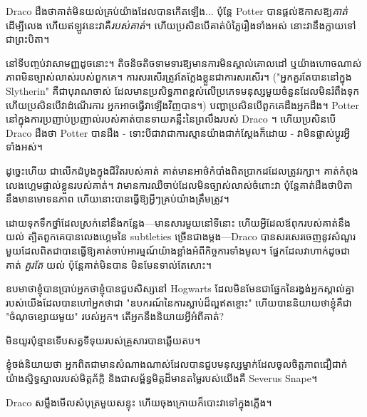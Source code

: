 Draco ដឹងថាគាត់មិនយល់គ្រប់យ៉ាងដែលបានកើតឡើង... ប៉ុន្តែ Potter បានផ្តល់ឱកាសឱ្យ\emph{គាត់} ដើម្បីលេង ហើយឥឡូវនេះវាគឺ\emph{របស់គាត់}។ ហើយ​ប្រសិន​បើ​គាត់​បំភ្លៃ​រឿង​ទាំង​អស់ នោះ​វា​នឹង​ក្លាយ​ទៅ​ជា​ព្រះបិតា។

នៅទីបញ្ចប់វាសាមញ្ញដូចនោះ។ តិចនិចតិចទាមទារឱ្យមានការមិនស្គាល់គោលដៅ ឬយ៉ាងហោចណាស់ភាពមិនច្បាស់លាស់របស់ពួកគេ។ ការ​សរសើរ​ត្រូវ​តែ​ក្លែង​ខ្លួន​ជា​ការ​សរសើរ។ ("អ្នកគួរតែបាននៅក្នុង Slytherin" គឺជាបុរាណចាស់ ដែលមានប្រសិទ្ធភាពខ្ពស់លើប្រភេទមនុស្សមួយចំនួនដែលមិនរំពឹងទុក ហើយប្រសិនបើវាដំណើរការ អ្នកអាចធ្វើវាឡើងវិញបាន។) បញ្ហាប្រសិនបើពួកគេដឹងអ្នកដឹង។ Potter នៅក្នុងការប្រញាប់ប្រញាល់របស់គាត់បានទាយគន្លឹះនៃព្រលឹងរបស់ Draco ។ ហើយប្រសិនបើ Draco ដឹងថា Potter បានដឹង - ទោះបីជាវាជាការស្មានយ៉ាងជាក់ស្តែងក៏ដោយ - វាមិនផ្លាស់ប្តូរអ្វីទាំងអស់។

ដូច្នេះហើយ ជាលើកដំបូងក្នុងជីវិតរបស់គាត់ គាត់មានអាថ៌កំបាំងពិតប្រាកដដែលត្រូវរក្សា។ គាត់កំពុងលេងហ្គេមផ្ទាល់ខ្លួនរបស់គាត់។ វាមានការឈឺចាប់ដែលមិនច្បាស់លាស់ចំពោះវា ប៉ុន្តែគាត់ដឹងថាបិតានឹងមានមោទនភាព ហើយនោះបានធ្វើឱ្យអ្វីៗគ្រប់យ៉ាងត្រឹមត្រូវ។

ដោយទុកទឹកថ្នាំដែលស្រក់នៅនឹងកន្លែង—មានសារមួយនៅទីនោះ ហើយអ្វីដែលឪពុករបស់គាត់នឹងយល់ ត្បិតពួកគេបានលេងហ្គេមនៃ subtleties ច្រើនជាងម្តង—Draco បានសរសេរចេញនូវសំណួរមួយដែលពិតជាបានធ្វើឱ្យគាត់ចាប់អារម្មណ៍យ៉ាងខ្លាំងអំពីកិច្ចការទាំងមូល។ ផ្នែកដែលវាហាក់ដូចជាគាត់ \emph{គួរតែ} យល់ ប៉ុន្តែគាត់មិនបាន មិនមែនទាល់តែសោះ។

\begin{writtenNote}

ឧបមាថាខ្ញុំបានប្រាប់អ្នកថាខ្ញុំបានជួបសិស្សនៅ Hogwarts ដែលមិនមែនជាផ្នែកនៃរង្វង់អ្នកស្គាល់គ្នារបស់យើងដែលបានហៅអ្នកថាជា "ឧបករណ៍នៃការស្លាប់ដ៏ល្អឥតខ្ចោះ" ហើយបាននិយាយថាខ្ញុំគឺជា "ចំណុចខ្សោយមួយ" របស់អ្នក។ តើអ្នកនឹងនិយាយអ្វីអំពីគាត់?

\end{writtenNote}

មិន​យូរ​ប៉ុន្មាន​ទើប​សត្វ​ទីទុយ​របស់​គ្រួសារ​បាន​ឆ្លើយ​តប។

\begin{writtenNote}

ខ្ញុំចង់និយាយថា អ្នកពិតជាមានសំណាងណាស់ដែលបានជួបមនុស្សម្នាក់ដែលចូលចិត្តភាពជឿជាក់យ៉ាងស្និទ្ធស្នាលរបស់មិត្តភ័ក្តិ និងជាសម្ព័ន្ធមិត្តដ៏មានតម្លៃរបស់យើងគឺ Severus Snape។

\end{writtenNote}

Draco សម្លឹងមើលសំបុត្រមួយសន្ទុះ ហើយចុងក្រោយក៏បោះវាទៅក្នុងភ្លើង។

